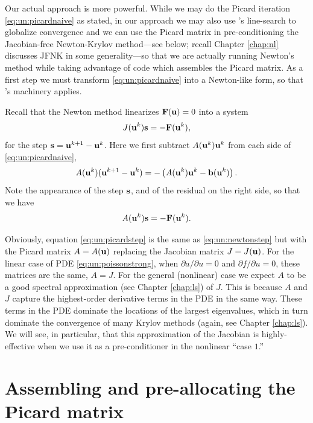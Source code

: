 Our actual approach is more powerful.  While we may do the Picard iteration \eqref{eq:un:picardnaive} as stated, in our approach we may also use \pSNES's line-search to globalize convergence and we can use the Picard matrix in pre-conditioning the Jacobian-free Newton-Krylov method---see below; recall Chapter \ref{chap:nl} discusses JFNK in some generality---so that we are actually running Newton's method while taking advantage of code which assembles the Picard matrix.  As a first step we must transform \eqref{eq:un:picardnaive} into a Newton-like form, so that \PETSc's \pSNES machinery applies.

Recall that the Newton method linearizes $\mathbf{F}(\mathbf{u})=0$ into a system
\begin{equation}
J(\mathbf{u}^k) \mathbf{s} = -\mathbf{F}(\mathbf{u}^k),  \label{eq:un:newtonstep}
\end{equation}
for the step $\mathbf{s} = \mathbf{u}^{k+1}-\mathbf{u}^k$.  Here we first subtract $A(\mathbf{u}^k) \mathbf{u}^k$ from each side of \eqref{eq:un:picardnaive},
\begin{equation*}
A(\mathbf{u}^k) (\mathbf{u}^{k+1}-\mathbf{u}^k) = - \left(A(\mathbf{u}^k) \mathbf{u}^k - \mathbf{b}(\mathbf{u}^k)\right).
\end{equation*}
Note the appearance of the step $\mathbf{s}$, and of the residual on the right side, so that we have
\begin{equation}
A(\mathbf{u}^k) \mathbf{s} = -\mathbf{F}(\mathbf{u}^k).  \label{eq:un:picardstep}
\end{equation}

Obviously, equation \eqref{eq:un:picardstep} is the same as \eqref{eq:un:newtonstep} but with the Picard matrix $A=A(\mathbf{u})$ replacing the Jacobian matrix $J=J(\mathbf{u})$.  For the linear case of PDE \eqref{eq:un:poissonstrong}, when $\partial a/\partial u=0$ and $\partial f/\partial u=0$, these matrices are the same, $A=J$.  For the general (nonlinear) case we expect $A$ to be a good spectral approximation (see Chapter \ref{chap:ls}) of $J$.  This is because $A$ and $J$ capture the highest-order derivative terms in the PDE in the same way.  These terms in the PDE dominate the locations of the largest eigenvalues, which in turn dominate the convergence of many Krylov methods (again, see Chapter \ref{chap:ls}).  We will see, in particular, that this approximation of the Jacobian is highly-effective when we use it as a pre-conditioner in the nonlinear ``case $1$.''


\section{Assembling and pre-allocating the Picard matrix}


